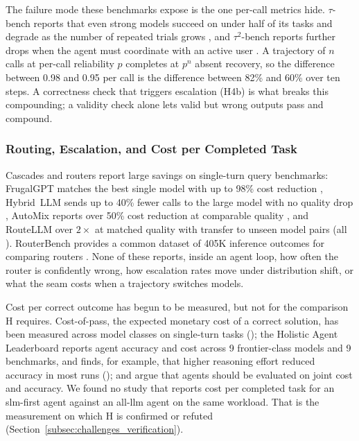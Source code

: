 The failure mode these benchmarks expose is the one per-call metrics hide. $\tau$-bench reports that even strong models succeed on under half of its tasks and degrade as the number of repeated trials grows \citep{yao2024taubench}, and $\tau^2$-bench reports further drops when the agent must coordinate with an active user \citep{barres2025tau2}. A trajectory of $n$ calls at per-call reliability $p$ completes at $p^n$ absent recovery, so the difference between 0.98 and 0.95 per call is the difference between 82\% and 60\% over ten steps. A correctness check that triggers escalation (H4b) is what breaks this compounding; a validity check alone lets valid but wrong outputs pass and compound.

\subsubsection{Routing, Escalation, and Cost per Completed Task}
\label{subsubsec:agentic_ev_routing}

Cascades and routers report large savings on single-turn query benchmarks: FrugalGPT matches the best single model with up to 98\% cost reduction \citep{chen2023frugalgpt}, Hybrid~LLM sends up to 40\% fewer calls to the large model with no quality drop \citep{ding2024hybridllm}, AutoMix reports over 50\% cost reduction at comparable quality \citep{aggarwal2024automix}, and RouteLLM over $2\times$ at matched quality with transfer to unseen model pairs \citep{ong2024routellm} (all \evC). RouterBench provides a common dataset of 405K inference outcomes for comparing routers \citep{hu2024routerbench}. None of these reports, inside an agent loop, how often the router is confidently wrong, how escalation rates move under distribution shift, or what the seam costs when a trajectory switches models.

Cost per correct outcome has begun to be measured, but not for the comparison H requires. Cost-of-pass, the expected monetary cost of a correct solution, has been measured across model classes on single-turn tasks \citep{erol2025costofpass} (\evB); the Holistic Agent Leaderboard reports agent accuracy and cost across 9 frontier-class models and 9 benchmarks, and finds, for example, that higher reasoning effort reduced accuracy in most runs \citep{kapoor2025hal} (\evB); and \citet{kapoor2024agentsmatter} argue that agents should be evaluated on joint cost and accuracy. We found no study that reports cost per completed task for an \gls{slm}-first agent against an all-\gls{llm} agent on the same workload. That is the measurement on which H is confirmed or refuted (Section~\ref{subsec:challenges_verification}).

